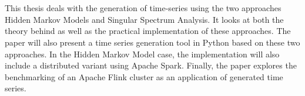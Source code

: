 \chapter{\abstractname}



This thesis deals with the generation of time-series using the two approaches Hidden Markov Models and Singular Spectrum Analysis. It looks at both the theory behind as well as the practical implementation of these approaches. The paper will also present a time series generation tool in Python based on these two approaches. In the Hidden Markov Model case, the implementation will also include a distributed variant using Apache Spark. Finally, the paper explores the benchmarking of an Apache Flink cluster as an application of generated time series. 